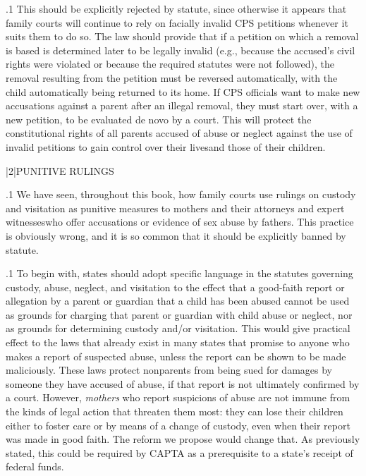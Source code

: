 \documentclass[11pt, twoside]{article}
\begin{document}
{\p.1{%
This should be explicitly rejected by statute, since
otherwise it appears that family courts will continue to rely on facially invalid CPS
petitions whenever it suits them to do so. The law should provide that if
a petition on which a removal is based is determined later to be legally
invalid (e.g., because the accused’s civil rights were violated or because
the required statutes were not followed), the removal resulting from the
petition must be reversed automatically, with the child automatically being returned to its home. If CPS officials want to make new accusations
against a parent after an illegal removal, they must start over, with a new
petition, to be evaluated de novo by a court. This will protect the constitutional rights of all parents accused of abuse or neglect against the use
of invalid petitions to gain control over their lives\mdash{}and those of their
children.
}%


\s|2|{PUNITIVE RULINGS}

\p.1{%
\noindent{}We have seen, throughout this book, how family courts use rulings on
custody and visitation as punitive measures to  mothers\mdash{}
and their attorneys and expert witnesses\mdash{}who offer accusations or
evidence of sex abuse by fathers. This practice is obviously wrong, and
it is so common that it should be explicitly banned by statute.
}%

\p.1{%
To begin with, states should adopt specific language in the statutes
governing custody, abuse, neglect, and visitation to the effect that a
good-faith report or allegation by a parent or guardian that a child has
been abused cannot be used as grounds for charging that parent or
guardian with child abuse or neglect, nor as grounds for determining
custody and/or visitation. This would give practical effect to the laws
that already exist in many states that promise  to anyone who
makes a report of suspected abuse, unless the report can be shown to be
made maliciously. These laws protect nonparents from being sued for
damages by someone they have accused of abuse, if
that report is not ultimately confirmed by a
court. However, \textit{mothers} who report suspicions of
abuse are not immune from the kinds of legal action that threaten them
most: they can lose their children either to foster care or by means of a
change of custody, even when their report was made in good faith. The
reform we propose would change that. As previously stated, this could
be required by CAPTA as a prerequisite to a state’s receipt of federal
funds.
}%

}
\end{document}
